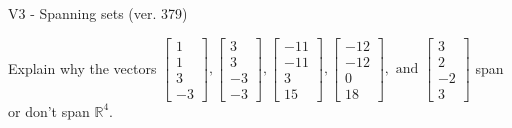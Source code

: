 \begin{exercise}
  \begin{exerciseTitle}V3 - Spanning sets (ver. 379)\end{exerciseTitle}
  \begin{exerciseStatement}
    Explain why the vectors \(\left[\begin{array}{r}
1 \\
1 \\
3 \\
-3
\end{array}\right] , \left[\begin{array}{r}
3 \\
3 \\
-3 \\
-3
\end{array}\right] , \left[\begin{array}{r}
-11 \\
-11 \\
3 \\
15
\end{array}\right] , \left[\begin{array}{r}
-12 \\
-12 \\
0 \\
18
\end{array}\right] , \text{ and } \left[\begin{array}{r}
3 \\
2 \\
-2 \\
3
\end{array}\right]\) span or don't span \(\mathbb{R}^4\). 
	



\end{exerciseStatement}
\end{exercise}
